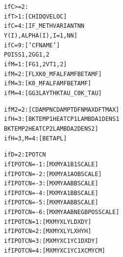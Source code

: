 \documentclass[12pt]{report}
\renewcommand{\magenta}[1]{}
\begin{document}
\begin{alltt}

if C>=2:\magenta{
      if T<=1 & M=5: [ DT                   ]}
      if T>1: [ CHI  DQ   VELOC             ]
      if C=4: [ IF\_METH   VARIANT   NN
                Y(I), ALPHA(I), I=1,NN      ]
      if C=9: [ 'CFNAME'                    ]
                POISS 1, 2   GG 1, 2
\magenta{      if B=1: [ FLXZ                        ]
}      if M=1: [ FG 1, 2   VT 1, 2           ]
      if M=2: [ FLX  K0\_MF   ALFAMF  BETAMF ]
      if M=3\magenta{,5}: [      K0\_MF   ALFAMF  BETAMF ]
      if M=4: [ GG3  LAYTHK  TAU\_C0  K\_TAU  ]


if M2=2:     [ CDAMPN   CDAMPT   DFNMAX   DFTMAX ]
\magenta{if M3=2:     [ UTHRS    LPOW0    LPOW1             ]
}if H=3:      [ BKTEMP1  HEATCP1  LAMBDA1  DENS1           
               BKTEMP2  HEATCP2  LAMBDA2  DENS2  ]
if H=3, M=4: [ BETAPL                            ]


if D=2: IPOTCN
      if IPOTCN=-1: [ MX  MY  A1  B1   SCALE ]
      if IPOTCN=-2: [ MX  MY  A1  AOB  SCALE ]
      if IPOTCN=-3: [ MX  MY  AA  BB   SCALE ]
      if IPOTCN=-4: [ MX  MY  A1  BB   SCALE ]
      if IPOTCN=-5: [ MX  MY  AA  BB   SCALE ]
      if IPOTCN=-6: [ MX  MY  AA  BNEG BPOS SCALE ]
      if IPOTCN= 1: [ MX  MY  XL  YL   DX   DY  ]
      if IPOTCN= 2: [ MX  MY  XL  YL   XH   YH  ]
      if IPOTCN= 3: [ MX  MY  XC1 YC1  DX   DY  ]
      if IPOTCN= 4: [ MX  MY  XC1 YC1  XCM  YCM ]



\end{alltt}
\end{document}
